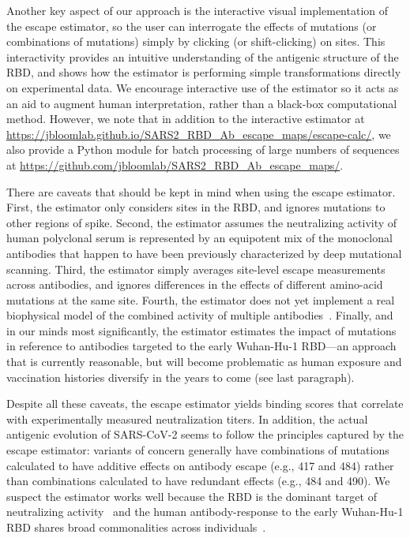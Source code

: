 \documentclass[9pt,twocolumn,twoside]{gsajnl_modified}
\begin{document}
Another key aspect of our approach is the interactive visual implementation of the escape estimator, so the user can interrogate the effects of mutations (or combinations of mutations) simply by clicking (or shift-clicking) on sites.
This interactivity provides an intuitive understanding of the antigenic structure of the RBD, and shows how the estimator is performing simple transformations directly on experimental data.
We encourage interactive use of the estimator so it acts as an aid to augment human interpretation, rather than a black-box computational method.
However, we note that in addition to the interactive estimator at \url{https://jbloomlab.github.io/SARS2_RBD_Ab_escape_maps/escape-calc/}, we also provide a Python module for batch processing of large numbers of sequences at \url{https://github.com/jbloomlab/SARS2_RBD_Ab_escape_maps/}.

There are caveats that should be kept in mind when using the escape estimator.
First, the estimator only considers sites in the RBD, and ignores mutations to other regions of spike.
Second, the estimator assumes the neutralizing activity of human polyclonal serum is represented by an equipotent mix of the monoclonal antibodies that happen to have been previously characterized by deep mutational scanning.
Third, the estimator simply averages site-level escape measurements across antibodies, and ignores differences in the effects of different amino-acid mutations at the same site.
Fourth, the estimator does not yet implement a real biophysical model of the combined activity of multiple antibodies~\citep{einav2020two}.
Finally, and in our minds most significantly, the estimator estimates the impact of mutations in reference to antibodies targeted to the early Wuhan-Hu-1 RBD---an approach that is currently reasonable, but will become problematic as human exposure and vaccination histories diversify in the years to come (see last paragraph).

Despite all these caveats, the escape estimator yields binding scores that correlate with experimentally measured neutralization titers.
In addition, the actual antigenic evolution of SARS-CoV-2 seems to follow the principles captured by the escape estimator: variants of concern generally have combinations of mutations calculated to have additive effects on antibody escape (e.g., 417 and 484) rather than combinations calculated to have redundant effects (e.g., 484 and 490).
We suspect the estimator works well because the RBD is the dominant target of neutralizing activity~\citep{piccoli2020mapping,greaney2021comprehensive,schmidt2021high} and the human antibody-response to the early Wuhan-Hu-1 RBD shares broad commonalities across individuals~\citep{yuan2020structural,robbiani2020convergent,greaney2021comprehensive,greaney2021mapping,chen2021convergent}.
\end{document}
